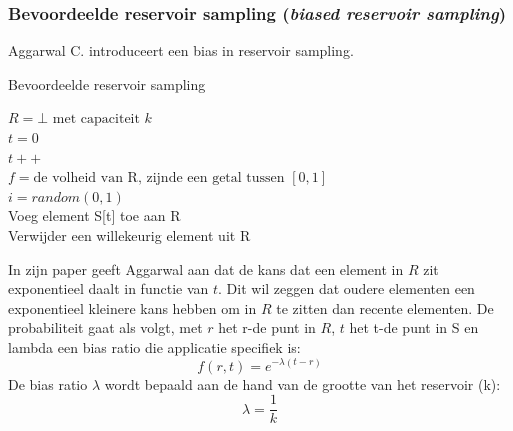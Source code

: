 \subsubsection{Bevoordeelde reservoir sampling (\textit{biased reservoir sampling})}
Aggarwal C. \cite{biased reservoir sampling} introduceert een bias in reservoir sampling.

\begin{algorithm}
\caption*{Bevoordeelde reservoir sampling}
$R = \bot \text{ met capaciteit }k$\\
$t=0$\\
{
$t++$\\
$f=\text{de volheid van R, zijnde een getal tussen }[0,1]$\\
$i = random(0,1)$\\
Voeg element S[t] toe aan R\\
{Verwijder een willekeurig element uit R}
}
\end{algorithm}
\noindent In zijn paper geeft Aggarwal aan dat de kans dat een element in $R$ zit exponentieel daalt in functie van $t$. Dit wil zeggen dat oudere elementen een exponentieel kleinere kans hebben om in $R$ te zitten dan recente elementen. De probabiliteit gaat als volgt, met $r$ het r-de punt in $R$, $t$ het t-de punt in S en \gls{lambda} een bias ratio die applicatie specifiek is:
\[f(r,t)=e^{-\lambda(t-r)}\]
De bias ratio $\lambda$ wordt bepaald aan de hand van de grootte van het reservoir (k):
\[\lambda=\frac{1}{k}\]

